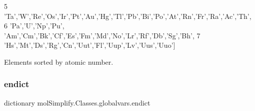 \begin{DoxyCode}
5             \textcolor{stringliteral}{'Ta'},\textcolor{stringliteral}{'W'},\textcolor{stringliteral}{'Re'},\textcolor{stringliteral}{'Os'},\textcolor{stringliteral}{'Ir'},\textcolor{stringliteral}{'Pt'},\textcolor{stringliteral}{'Au'},\textcolor{stringliteral}{'Hg'},\textcolor{stringliteral}{'Tl'},\textcolor{stringliteral}{'Pb'},\textcolor{stringliteral}{'Bi'},\textcolor{stringliteral}{'Po'},\textcolor{stringliteral}{'At'},\textcolor{stringliteral}{'Rn'},\textcolor{stringliteral}{'Fr'},\textcolor{stringliteral}{'Ra'},\textcolor{stringliteral}{'Ac'},\textcolor{stringliteral}{'Th'},
6             \textcolor{stringliteral}{'Pa'},\textcolor{stringliteral}{'U','}Np','Pu', 'Am','Cm','Bk','Cf','Es','Fm','Md','No','Lr','Rf','Db','Sg','Bh',
7             \textcolor{stringliteral}{'Hs'},\textcolor{stringliteral}{'Mt'},\textcolor{stringliteral}{'Ds'},\textcolor{stringliteral}{'Rg'},\textcolor{stringliteral}{'Cn'},\textcolor{stringliteral}{'Uut'},\textcolor{stringliteral}{'Fl'},\textcolor{stringliteral}{'Uup'},\textcolor{stringliteral}{'Lv'},\textcolor{stringliteral}{'Uus'},\textcolor{stringliteral}{'Uuo'}]
\end{DoxyCode}


Elements sorted by atomic number. 

\mbox{\label{namespacemolSimplify_1_1Classes_1_1globalvars_a01f6eb6722ce46d78ee3004480cbd069}} 
\subsubsection{\texorpdfstring{endict}{endict}}
{\footnotesize\ttfamily dictionary mol\+Simplify.\+Classes.\+globalvars.\+endict}


